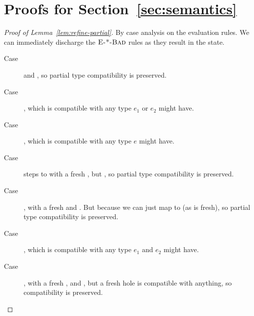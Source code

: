 \section{Proofs for Section~\ref{sec:semantics}}
\label{sec:proofs}


\begin{proof}[Proof of Lemma~\ref{lem:refine-partial}]
  By case analysis on the evaluation rules. We can immediately discharge
  the $\textsc{E-*-Bad}$ rules as they result in the \stuck state.
  \begin{description}
  \item[Case \replusgood]  and
    , so partial type compatibility is preserved.
  \item[Case ]
    , which is compatible with any
    type $e_1$ or $e_2$ might have.
  \item[Case \reappgood] , which is
    compatible with any type $e$ might have.
  \item[Case \eleaf] \eleaf steps to \vleaf{\thole} with a fresh \thole,
    but \hastype{\eleaf}{\ttree{\thole}}, so partial type compatibility
    is preserved.
  \item[Case \renodegood]
    , with a fresh \thole
    and . But
     because we can just map \thole to
     (as \thole is fresh), so partial type compatibility is
    preserved.
  \item[Case ]
    , which is compatible
    with any type $e_1$ and $e_2$ might have.
  \item[Case \reholegood] \hastype{\ehole}{\thole}, with a fresh
    \thole, and \hastype{\vhole{\thole}}{\thole}, but a fresh hole is
    compatible with anything, so compatibility is preserved.
  \end{description}

\end{proof}


